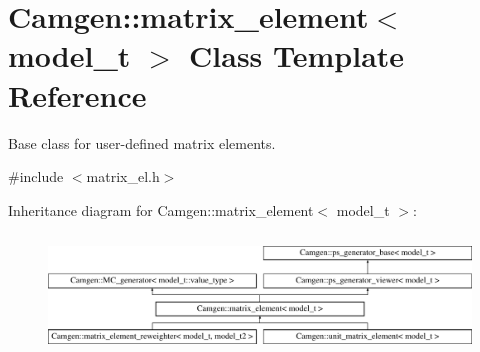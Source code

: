 \hypertarget{a00363}{}\section{Camgen\+:\+:matrix\+\_\+element$<$ model\+\_\+t $>$ Class Template Reference}
\label{a00363}


Base class for user-\/defined matrix elements.  




{\ttfamily \#include $<$matrix\+\_\+el.\+h$>$}

Inheritance diagram for Camgen\+:\+:matrix\+\_\+element$<$ model\+\_\+t $>$\+:\begin{figure}[H]
\begin{center}
\leavevmode
\includegraphics[height=3.218391cm]{a00363}
\end{center}
\end{figure}
